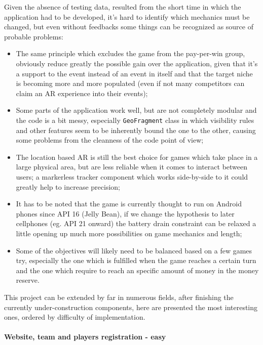 	Given the absence of testing data, resulted from the short time in which the application had to be developed, it's hard to identify which mechanics must be changed, but even without feedbacks some things can be recognized as source of probable problems:
	\begin{itemize}
		\item The same principle which excludes the game from the pay-per-win group, obviously reduce greatly the possible gain over the application, given that it's a support to the event instead of an event in itself and that the target niche is becoming more and more populated (even if not many competitors can claim an AR experience into their events);
		\item Some parts of the application work well, but are not completely modular and the code is a bit messy, especially \lstinline|GeoFragment| class in which visibility rules and other features seem to be inherently bound the one to the other, causing some problems from the cleanness of the code point of view;
		\item The location based AR is still the best choice for games which take place in a large physical area, but are less reliable when it comes to interact between users; a markerless tracker component which works side-by-side to it could greatly help to increase precision;
		\item It has to be noted that the game is currently thought to run on Android phones since API 16 (Jelly Bean), if we change the hypothesis to later cellphones (eg. API 21 onward) the battery drain constraint can be relaxed a little opening up much more possibilities on game mechanics and length;
		\item Some of the objectives will likely need to be balanced based on a few games try, especially the one which is fulfilled when the game reaches a certain turn and the one which require to reach an specific amount of money in the money reserve.
	\end{itemize}
	
	This project can be extended by far in numerous fields, after finishing the currently under-construction components, here are presented the most interesting ones, ordered by difficulty of implementation.
	
	\paragraph{Website, team and players registration - easy}
		
